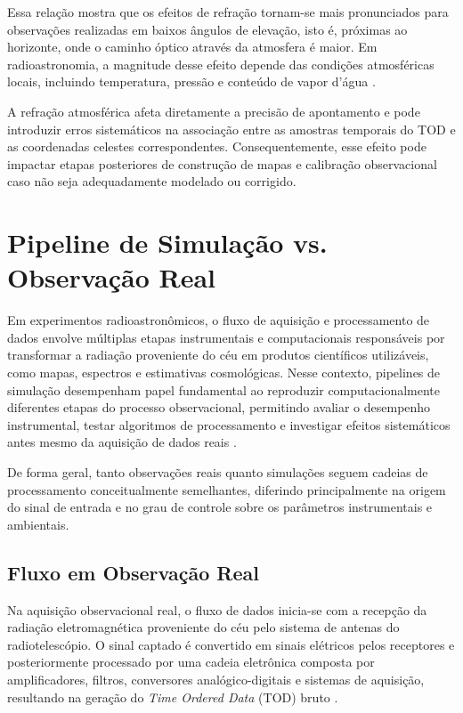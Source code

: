 Essa relação mostra que os efeitos de refração tornam-se mais pronunciados para observações realizadas em baixos ângulos de elevação, isto é, próximas ao horizonte, onde o caminho óptico através da atmosfera é maior. Em radioastronomia, a magnitude desse efeito depende das condições atmosféricas locais, incluindo temperatura, pressão e conteúdo de vapor d'água \cite{thompson2017interferometry}.

A refração atmosférica afeta diretamente a precisão de apontamento e pode introduzir erros sistemáticos na associação entre as amostras temporais do TOD e as coordenadas celestes correspondentes. Consequentemente, esse efeito pode impactar etapas posteriores de construção de mapas e calibração observacional caso não seja adequadamente modelado ou corrigido.

\section{Pipeline de Simulação vs. Observação Real}

Em experimentos radioastronômicos, o fluxo de aquisição e processamento de dados envolve múltiplas etapas instrumentais e computacionais responsáveis por transformar a radiação proveniente do céu em produtos científicos utilizáveis, como mapas, espectros e estimativas cosmológicas. Nesse contexto, pipelines de simulação desempenham papel fundamental ao reproduzir computacionalmente diferentes etapas do processo observacional, permitindo avaliar o desempenho instrumental, testar algoritmos de processamento e investigar efeitos sistemáticos antes mesmo da aquisição de dados reais \cite{mericia2019hi,melo202Xbingo}.

De forma geral, tanto observações reais quanto simulações seguem cadeias de processamento conceitualmente semelhantes, diferindo principalmente na origem do sinal de entrada e no grau de controle sobre os parâmetros instrumentais e ambientais.

\subsection{Fluxo em Observação Real}

Na aquisição observacional real, o fluxo de dados inicia-se com a recepção da radiação eletromagnética proveniente do céu pelo sistema de antenas do radiotelescópio. O sinal captado é convertido em sinais elétricos pelos receptores e posteriormente processado por uma cadeia eletrônica composta por amplificadores, filtros, conversores analógico-digitais e sistemas de aquisição, resultando na geração do \textit{Time Ordered Data} (TOD) bruto \cite{ramalho2023impactos}.


